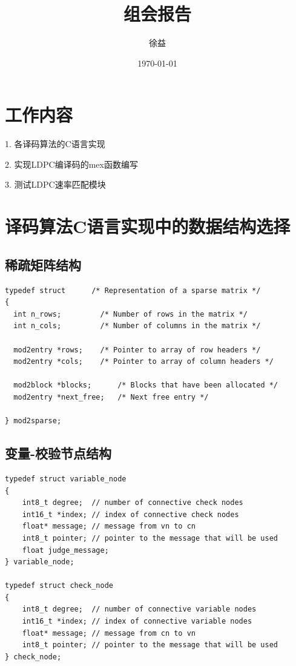 \documentclass{article}
\title{组会报告}
\author{徐益}
\date{\today}
\begin{document}
\maketitle


\section{工作内容}
1. 各译码算法的C语言实现

2. 实现LDPC编译码的mex函数编写

3. 测试LDPC速率匹配模块

\section{译码算法C语言实现中的数据结构选择}
\subsection{稀疏矩阵结构}
\lstset{language=C++}
\begin{lstlisting}
typedef struct		/* Representation of a sparse matrix */
{ 
  int n_rows;		  /* Number of rows in the matrix */
  int n_cols;		  /* Number of columns in the matrix */

  mod2entry *rows;	  /* Pointer to array of row headers */
  mod2entry *cols;	  /* Pointer to array of column headers */

  mod2block *blocks;	  /* Blocks that have been allocated */
  mod2entry *next_free;	  /* Next free entry */

} mod2sparse;
\end{lstlisting}
\subsection{变量-校验节点结构}
\lstset{language=C++}
\begin{lstlisting}
typedef struct variable_node
{
	int8_t degree;	// number of connective check nodes
	int16_t *index;	// index of connective check nodes
	float* message;	// message from vn to cn
	int8_t pointer;	// pointer to the message that will be used
	float judge_message;
} variable_node;

typedef struct check_node
{
	int8_t degree;	// number of connective variable nodes
	int16_t *index;	// index of connective variable nodes
	float* message;	// message from cn to vn
	int8_t pointer;	// pointer to the message that will be used
} check_node;
\end{lstlisting}
\end{document}
